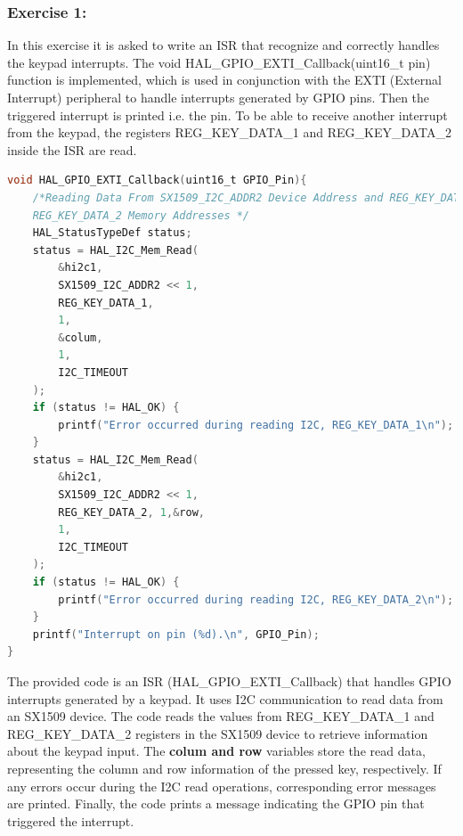 \documentclass[english]{article}
\begin{document}
\subsubsection{Exercise 1:}
In this exercise it is asked to write an ISR that recognize and correctly handles 
the keypad interrupts. The void HAL\_GPIO\_EXTI\_Callback(uint16\_t pin) function 
is implemented, which is used in conjunction with the EXTI (External Interrupt) 
peripheral to handle interrupts generated by GPIO pins. Then the triggered interrupt
is printed i.e. the pin. To be able to receive another interrupt from the keypad, 
the registers REG\_KEY\_DATA\_1 and REG\_KEY\_DATA\_2 inside the ISR are read.
\begin{lstlisting}[language=C, caption={Interrupt Callback}]
void HAL_GPIO_EXTI_Callback(uint16_t GPIO_Pin){
    /*Reading Data From SX1509_I2C_ADDR2 Device Address and REG_KEY_DATA_1 and 
    REG_KEY_DATA_2 Memory Addresses */
    HAL_StatusTypeDef status;
    status = HAL_I2C_Mem_Read(
        &hi2c1,
        SX1509_I2C_ADDR2 << 1,
        REG_KEY_DATA_1,
        1,
        &colum,
        1,
        I2C_TIMEOUT
    );
    if (status != HAL_OK) {
        printf("Error occurred during reading I2C, REG_KEY_DATA_1\n");
    }
    status = HAL_I2C_Mem_Read(
        &hi2c1,
        SX1509_I2C_ADDR2 << 1,
        REG_KEY_DATA_2, 1,&row,
        1, 
        I2C_TIMEOUT
    );
    if (status != HAL_OK) {
        printf("Error occurred during reading I2C, REG_KEY_DATA_2\n");
    }
    printf("Interrupt on pin (%d).\n", GPIO_Pin);
}
\end{lstlisting}
The provided code is an ISR (HAL\_GPIO\_EXTI\_Callback) that handles 
GPIO interrupts generated by a keypad. It uses I2C communication to 
read data from an SX1509 device. The code reads the values from REG\_KEY\_DATA\_1
 and REG\_KEY\_DATA\_2 registers in the SX1509 device to retrieve information
  about the keypad input. The \textbf{colum and row} variables store the read data,
   representing the column and row information of the pressed key, respectively.
    If any errors occur during the I2C read operations, corresponding error 
    messages are printed. Finally, the code prints a message indicating the 
    GPIO pin that triggered the interrupt.
\newpage
\end{document}

